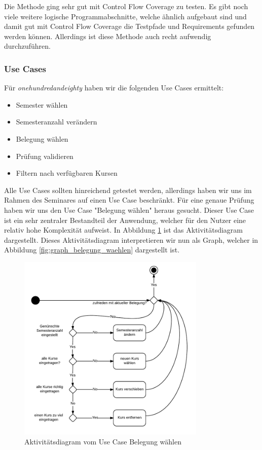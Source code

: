 \documentclass[ngerman]{article}
\begin{document}
Die Methode ging sehr gut mit Control Flow Coverage zu testen. Es gibt noch viele weitere logische Programmabschnitte, welche ähnlich aufgebaut sind und damit gut mit Control Flow Coverage die Testpfade und Requirements gefunden werden können. Allerdings ist diese Methode auch recht aufwendig durchzuführen. 



\subsubsection{Use Cases}
Für \emph{onehundredandeighty} haben wir die folgenden Use Cases ermittelt:

\begin{itemize}
    \item Semester wählen
    \item Semesteranzahl verändern
    \item Belegung wählen
    \item Prüfung validieren
    \item Filtern nach verfügbaren Kursen
\end{itemize}

Alle Use Cases sollten hinreichend getestet werden, allerdings haben wir uns im Rahmen des Seminares auf einen Use Case beschränkt.
Für eine genaue Prüfung haben wir uns den Use Case "Belegung wählen" heraus gesucht. Dieser Use Case ist ein sehr zentraler Bestandteil der Anwendung, welcher für den Nutzer eine relativ hohe Komplexität aufweist. In Abbildung \ref{fig:aktivity_belegung_waehlen} ist das Aktivitätsdiagram dargestellt. Dieses Aktivitätsdiagram interpretieren wir nun als Graph, welcher in Abbildung \ref{fig:graph_belegung_waehlen} dargestellt ist.

\begin{figure}[h!]
\includegraphics[width=0.8\textwidth]{figures/180_Belegungaendern_aktivitaet.pdf}
\caption{Aktivitätsdiagram vom Use Case Belegung wählen}
\label{fig:aktivity_belegung_waehlen}
\end{figure}
\end{document}
